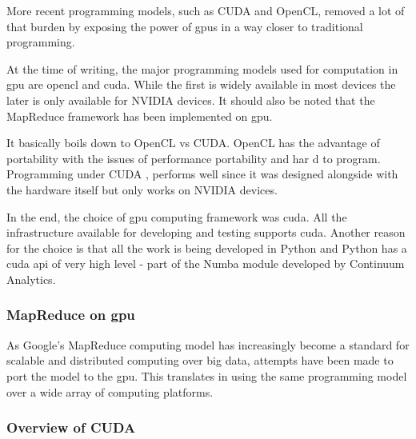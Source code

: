 More recent programming models, such as CUDA and OpenCL, removed a lot of that burden by exposing the power of \gls{gpu}s in a way closer to traditional programming.

At the time of writing, the major programming models used for computation in \gls{gpu} are \gls{opencl} and \gls{cuda}. While the first is widely available in most devices the later is only available for NVIDIA devices.
It should also be noted that the MapReduce framework has been implemented on \gls{gpu}.



It basically boils down to OpenCL vs CUDA. OpenCL has the advantage of portability with the issues of performance portability and har d to program. Programming under CUDA , performs well since it was designed alongside with the hardware itself but only works on NVIDIA devices.






In the end, the choice of \gls{gpu} computing framework was \gls{cuda}. All the infrastructure available for developing and testing supports \gls{cuda}. Another reason for the choice is that all the work is being developed in Python and Python has a \gls{cuda} \gls{api} of very high level - part of the Numba module developed by Continuum Analytics. 






\subsubsection{MapReduce on \gls{gpu}}
As Google's MapReduce computing model has increasingly become a standard for scalable and distributed computing over big data, attempts have been made to port the model to the \gls{gpu}. This translates in using the same programming model over a wide array of computing platforms.


\subsubsection{Overview of CUDA}

